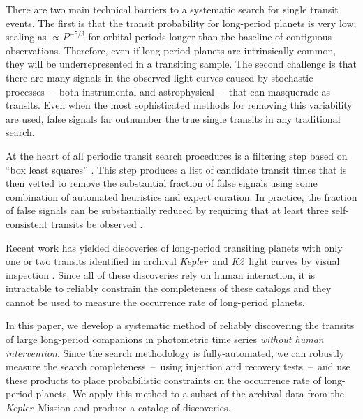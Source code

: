 \documentclass[manuscript, letterpaper]{aastex6}
\makeatletter
\let\origsection\section
\renewcommand\section{\@ifstar{\starsection}{\nostarsection}}
\newcommand\nostarsection[1]{\sectionprelude\origsection{#1}}
\newcommand\starsection[1]{\sectionprelude\origsection*{#1}}
\newcommand\sectionprelude{\vspace{1em}}
\newcommand{\project}[1]{\textsl{#1}}
\newcommand{\kepler}{\project{Kepler}}
\newcommand{\KT}{\project{K2}}
\newcommand{\bls}{\project{BLS}}
\newcommand{\paper}{paper}
\makeatother
\begin{document}
There are two main technical barriers to a systematic search for single
transit events.
The first is that the transit probability for long-period planets is very low;
scaling as $\propto P^{-5/3}$ for orbital periods longer than the
baseline of contiguous observations.
Therefore, even if long-period planets are intrinsically common, they will
be underrepresented in a transiting sample.
The second challenge is that there are many signals in the observed light
curves caused by stochastic processes~--~both instrumental and
astrophysical~--~that can masquerade as transits.
Even when the most sophisticated methods for removing this variability are
used, false signals far outnumber the true single transits in any traditional
search.

At the heart of all periodic transit search procedures is a filtering step
based on ``box least squares'' \citep[\bls;][]{Kovacs:2002}.
This step produces a list of candidate transit times that is then vetted to
remove the substantial fraction of false signals using some combination of
automated heuristics and expert curation.
In practice, the fraction of false signals can be substantially reduced by
requiring that at least three self-consistent transits be observed
\citep{Petigura:2013, Burke:2014, Rowe:2015, Coughlin:2016}.

Recent work has yielded discoveries of long-period transiting planets with
only one or two transits identified in archival \kepler\ and \KT\ light curves
by visual inspection \citep{Wang:2013, Kipping:2014a, Osborn:2016,
Kipping:2016, Uehara:2016, Wang:2015}.
Since all of these discoveries rely on human interaction, it is intractable to
reliably constrain the completeness of these catalogs and they cannot be used
to measure the occurrence rate of long-period planets.

In this \paper, we develop a systematic method of reliably discovering the
transits of large long-period companions in photometric time series
\emph{without human intervention}.
Since the search methodology is fully-automated, we can robustly measure the
search completeness~--~using injection and recovery tests~--~and use these
products to place probabilistic constraints on the occurrence rate of
long-period planets.
We apply this method to a subset of the archival data from the \kepler\
Mission and produce a catalog of discoveries.


\section{A fully-automated search method}
\end{document}
